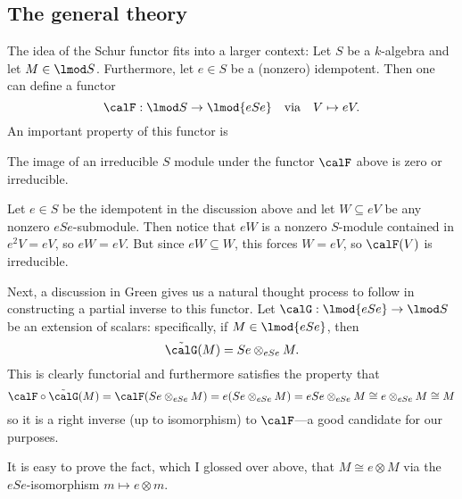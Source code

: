 \documentclass[12pt]{article}
\begin{document}
\subsection{The general theory}
The idea of the Schur functor fits into a larger context: Let $S$ be a $k$-algebra and let $M\in\lmod S$. Furthermore, let $e\in S$ be a (nonzero)
idempotent. Then one can define a functor 
\[\calF:\lmod S\to\lmod {eSe}\quad\text{via}\quad V\mapsto eV.\]
An important property of this functor is 
\begin{prop}\label{prop:F-irred}
	The image of an irreducible $S$ module under the functor $\calF$ above is zero or irreducible.
\end{prop}
\begin{prf}
	Let $e\in S$ be the idempotent in the discussion above and let $W\subseteq eV$ be any nonzero $eSe$-submodule.
	Then notice that $eW$ is a nonzero $S$-module contained in $e^2V=eV$, so $eW=eV$.
	But since $eW\subseteq W$, this forces $W=eV$, so $\calF(V)$ is irreducible.
\end{prf}

Next, a discussion in Green \cite[p. 56]{green} gives us a natural thought process to follow in constructing a partial inverse to this functor. 
Let $\calG:\lmod{eSe}\to\lmod S$ be an extension of scalars: specifically, if $M\in\lmod{eSe}$, then 
\[\tilde\calG(M)=Se\otimes_{eSe}M.\]
This is clearly functorial and furthermore satisfies the property that 
\[\calF\circ\tilde\calG(M)=\calF(Se\otimes_{eSe}M)=e(Se\otimes_{eSe}M)=eSe\otimes_{eSe} M\cong e\otimes_{eSe}M\cong M\]
so it is a right inverse (up to isomorphism) to $\calF$---a good candidate for our purposes. 
\begin{rmk}
	It is easy to prove the fact, which I glossed over above, that $M\cong e\otimes M$ via the $eSe$-isomorphism $m\mapsto e\otimes m$.
\end{rmk}
\end{document}
